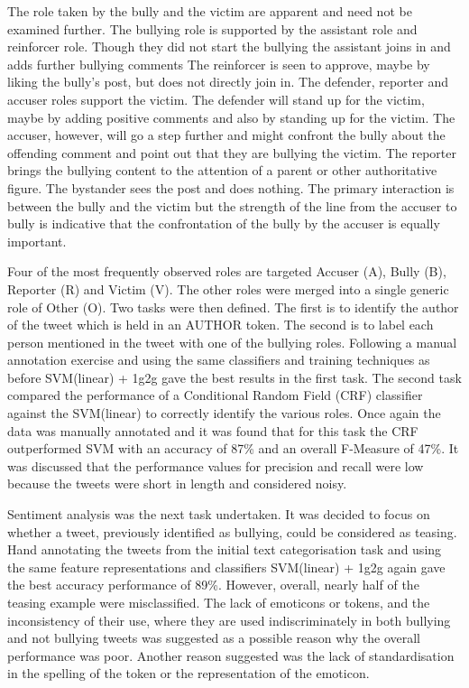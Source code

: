 The role taken by the bully and the victim are apparent and need not be examined further. The bullying role is supported by the assistant role and reinforcer role. Though they did not start the bullying the assistant joins in and adds further bullying comments The reinforcer is seen to approve, maybe by liking the bully's post, but does not directly join in. The defender, reporter and accuser roles support the victim. The defender will stand up for the victim, maybe by adding positive comments and also by standing up for the victim. The accuser, however, will go a step further and might confront the bully about the offending comment and point out that they are bullying the victim. The reporter brings the bullying content to the attention of a parent or other authoritative figure. The bystander sees the post and does nothing. The primary interaction is between the bully and the victim but the strength of the line from the accuser to bully is indicative that the confrontation of the bully by the accuser is equally important. 

Four of the most frequently observed roles are targeted Accuser (A), Bully (B), Reporter (R) and Victim (V). The other roles were merged into a single generic role of Other (O). Two tasks were then defined. The first is to identify the author of the tweet which is held in an AUTHOR token. The second is to label each person mentioned in the tweet with one of the bullying roles. Following a manual annotation exercise and using the same classifiers and training techniques as before SVM(linear) + 1g2g gave the best results in the first task. The second task compared the performance of a Conditional Random Field (CRF) classifier against the SVM(linear) to correctly identify the various roles. Once again the data was manually annotated and it was found that for this task the CRF outperformed SVM with an accuracy of 87\% and an overall F-Measure of 47\%. It was discussed that the performance values for precision and recall were low because the tweets were short in length and considered noisy.

Sentiment analysis was the next task undertaken. It was decided to focus on whether a tweet, previously identified as bullying, could be considered as teasing. Hand annotating the tweets from the initial text categorisation task and using the same feature representations and classifiers SVM(linear) + 1g2g again gave the best accuracy performance of 89\%. However, overall, nearly half of the teasing example were misclassified. The lack of emoticons or tokens, and the inconsistency of their use, where they are used indiscriminately in both bullying and not bullying tweets was suggested as a possible reason why the overall performance was poor. Another reason suggested was the lack of standardisation in the spelling of the token or the representation of the emoticon.  

